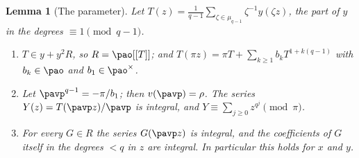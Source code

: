\documentclass[10pt]{amsart}
\newtheorem{lemma}[theorem]{Lemma}
\theoremstyle{definition}
\theoremstyle{remark}
\begin{document}
\begin{lemma}[The parameter]\label{pa:param}
Let $T(z)=\frac1{q-1}\sum_{\zeta\in\mu_{q-1}}\zeta^{-1}y(\zeta z)$, the part of $y$ in the degrees
$\equiv1\pmod{q-1}$.
\begin{enumerate}
\item[(a)] $T\in y+y^2R$, so $R=\pao[[T]]$; and $T(\pi z)=\pi T+\sum_{k\ge1}b_kT^{1+k(q-1)}$ with
$b_k\in\pao$ and $b_1\in\pao^\times$.
\item[(b)] Let $\pavp^{q-1}=-\pi/b_1$; then $v(\pavp)=\rho$. The series $Y(z)=T(\pavp z)/\pavp$ is
integral, and $Y\equiv\sum_{j\ge0}z^{q^j}\pmod\pi$.
\item[(c)] For every $G\in R$ the series $G(\pavp z)$ is integral, and the coefficients of $G$
itself in the degrees $<q$ in $z$ are integral. In particular this holds for $x$ and $y$.
\end{enumerate}
\end{lemma}
\end{document}
